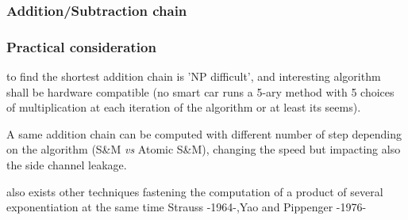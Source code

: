 \subsubsection*{Addition/Subtraction chain}	

\subsubsection*{Practical consideration}

to find the shortest addition chain is 'NP difficult', and interesting algorithm
shall be hardware compatible (no smart car runs a 5-ary method with 5 choices of
multiplication at each iteration of the algorithm or at least its seems).

A same addition chain can be computed with different number of step depending 
on the algorithm (S\&M \textit{vs} Atomic S\&M), changing the speed but impacting also the side channel leakage.


	
	 also exists other techniques fastening the computation of a
	 product of several exponentiation at the same time Strauss -1964-,Yao and Pippenger -1976-

